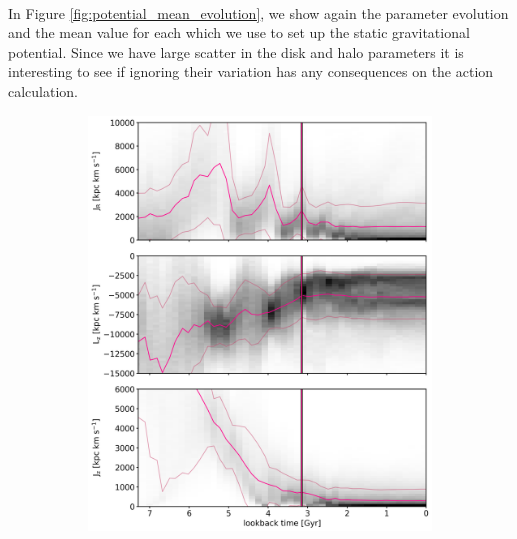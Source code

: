 \\In Figure \ref{fig:potential_mean_evolution}, we show again the parameter evolution and the mean value for each which we use to set up the static gravitational potential. Since we have large scatter in the disk and halo parameters it is interesting to see if ignoring their variation has any consequences on the action calculation. 
\begin{figure}[htbp]
\captionsetup{format=plain}
    \begin{subfigure}[c]{0.48\textwidth}
    \centering
    	\includegraphics[width=\textwidth]{plots/Dynamics/prog2/action_time_evolution_wodisk_hist_mean.png}
    \end{subfigure}
    ~
    \begin{subfigure}[c]{0.48\textwidth}
    \centering

\end{subfigure}
\end{figure}
